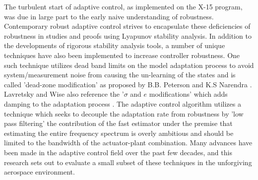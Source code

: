 The turbulent start of adaptive control, as implemented on the X-15 program, was due in large part to the early naive understanding of robustness.  Contemporary robust adaptive control strives to encapsulate these deficiencies of robustness in studies and proofs using Lyapunov stability analysis.  In addition to the developments of rigorous stability analysis tools, a number of unique techniques have also been implemented to increase controller robustness.  One such technique utilizes dead band limits on the model adaptation process to avoid system/measurement noise from causing the un-learning of the states and is called 'dead-zone modification' as proposed by B.B. Peterson and K.S Narendra \cite{peterson1982bounded}.  Lavretsky and Wise also reference the '$\sigma$ and $e$ modifications' which adds damping to the adaptation process \cite{lavretsky2013robust}.  The \Lone adaptive control algorithm utilizes a technique which seeks to decouple the adaptation rate from robustness by 'low pass filtering' the contribution of the fast estimator under the premise that estimating the entire frequency spectrum is overly ambitious and should be limited to the bandwidth of the actuator-plant combination.  Many advances have been made in the adaptive control field over the past few decades, and this research sets out to evaluate a small subset of these techniques in the unforgiving aerospace environment.

